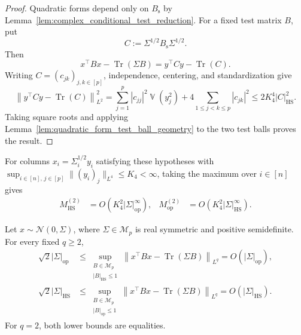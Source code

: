 \documentclass[EJP, preprint, NODS, nobera, nofontexpansion]{ejpecp}
\DeclareMathOperator{\op}{op}
\DeclareMathOperator{\tr}{Tr}
\DeclareMathOperator{\hs}{HS}
\DeclareMathOperator{\Var}{\mathbb V}
\begin{document}
\begin{proof}
Quadratic forms depend only on $B_{\mathrm s}$ by
Lemma~\ref{lem:complex_conditional_test_reduction}. For a fixed test matrix
$B$, put
\[
    C:=\Sigma^{1/2}B_{\mathrm s}\Sigma^{1/2}.
\]
Then
\[
    x^\top Bx-\tr(\Sigma B)
    =y^\top Cy-\tr(C).
\]
Writing $C=(c_{jk})_{j,k\in[p]}$, independence, centering, and
standardization give
\[
 \left\|y^\top Cy-\tr(C)\right\|_{L^2}^2
    ={}
 \sum_{j=1}^p|c_{jj}|^2\Var(y_j^2)
 +4\sum_{1\leq j<k\leq p}|c_{jk}|^2
 \leq 2K_4^4|C|_{\hs}^2.
\]
Taking square roots and applying
Lemma~\ref{lem:quadratic_form_test_ball_geometry} to the two test
balls proves the result.
\end{proof}

For columns $x_i=\Sigma_i^{1/2}y_i$ satisfying these hypotheses with
$\sup_{i\in[n],\,j\in[p]}\|(y_i)_j\|_{L^4}\leq K_4<\infty$,
taking the maximum over $i\in[n]$ gives
\begin{align*}
    M_{\hs}^{(2)}
    &=O\!\left(K_4^2|\Sigma|_{\op}^\infty\right),
    &
    M_{\op}^{(2)}
    &=O\!\left(K_4^2|\Sigma|_{\hs}^\infty\right).
\end{align*}

\begin{lemma}
\label{lem:gaussian_quadratic_form_moduli}
Let $x\sim\mathcal N(0,\Sigma)$, where $\Sigma\in\mathcal M_p$ is real
symmetric and positive semidefinite.  For every fixed $q\geq2$,
\begin{align}
    \sqrt2|\Sigma|_{\op}
    &\leq
    \sup_{\substack{B\in\mathcal M_p\\|B|_{\hs}\leq1}}
    \left\|x^{\top}Bx-\tr(\Sigma B)\right\|_{L^q}
    = O(|\Sigma|_{\op}),
    \label{eq:gaussian_hs_test_ball_exact_scale}
    \\
    \sqrt2|\Sigma|_{\hs}
    &\leq
    \sup_{\substack{B\in\mathcal M_p\\|B|_{\op}\leq1}}
    \left\|x^{\top}Bx-\tr(\Sigma B)\right\|_{L^q}
    = O(|\Sigma|_{\hs}).
    \label{eq:gaussian_operator_test_ball_exact_scale}
\end{align}
For \(q=2\), both lower bounds are equalities.
\end{lemma}
\end{document}
